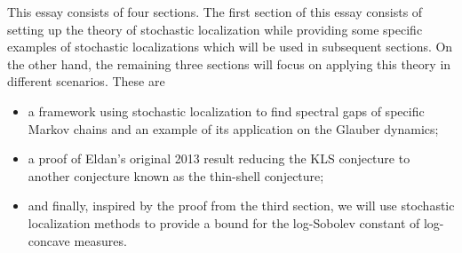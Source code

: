 This essay consists of four sections. The first section of this essay consists of setting up the 
theory of stochastic localization while providing some specific examples of stochastic localizations 
which will be used in subsequent sections. On the other hand, the remaining three sections will focus 
on applying this theory in different scenarios. These are 

\begin{itemize}
  \item a framework using stochastic localization to find spectral gaps of specific Markov chains and an 
    example of its application on the Glauber dynamics;
  \item a proof of Eldan's original 2013 result reducing the KLS conjecture to another conjecture known 
    as the thin-shell conjecture;
  \item and finally, inspired by the proof from the third section, we will use stochastic localization methods to 
    provide a bound for the log-Sobolev constant of log-concave measures.
\end{itemize}
